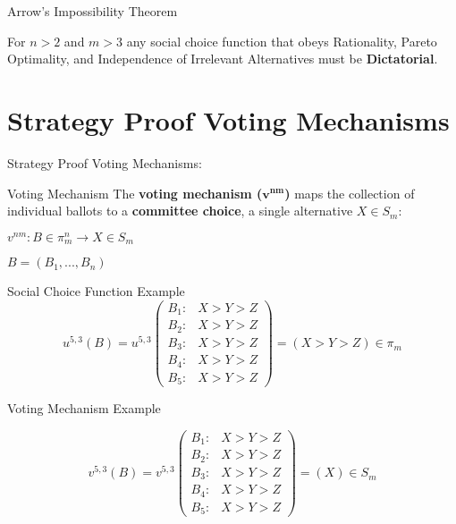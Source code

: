 \documentclass{beamer}
\begin{document}
\begin{frame}{Arrow's Impossibility Theorem}
    \begin{theorem}
    For $n > 2$ and $m > 3$ any social choice function that obeys Rationality, Pareto Optimality, and Independence of Irrelevant Alternatives must be \textbf{Dictatorial}.
    \end{theorem}
\end{frame}

\section{Strategy Proof Voting Mechanisms}

\begin{frame}
\large {Strategy Proof Voting Mechanisms:}
\end{frame}

\begin{frame}{Voting Mechanism}
    The \textbf{voting mechanism ($\mathbf{v^{nm}}$)} maps the collection of individual ballots to a \textbf{committee choice}, a single alternative $X \in S_m$:

    \vskip 0.5cm

    \center \huge $v^{nm}: B \in \pi_m^n \rightarrow X \in S_m$
    \vskip 1cm

\flushright \large $B = (B_1, ... , B_n)$
\end{frame}

\begin{frame}{Social Choice Function Example}
    \large \begin{equation*}
  u^{5,3}(B) = u^{5,3}\left(
    \begin{array}{cc}
      B_1: & \text{$X > Y > Z$}\\
      B_2: & \text{$X > Y > Z$}\\
      B_3: & \text{$X > Y > Z$}\\
      B_4: & \text{$X > Y > Z$}\\ 
      B_5: & \text{$X > Y > Z$}
    \end{array} 
    \right) = (X > Y > Z) \in \pi_m
\end{equation*}
\end{frame}

\begin{frame}{Voting Mechanism Example}

\large \begin{equation*}
  v^{5,3}(B) = v^{5,3}\left(
    \begin{array}{cc}
      B_1: & \text{$X > Y > Z$}\\
      B_2: & \text{$X > Y > Z$}\\
      B_3: & \text{$X > Y > Z$}\\
      B_4: & \text{$X > Y > Z$}\\ 
      B_5: & \text{$X > Y > Z$}
    \end{array} 
    \right) = (X) \in S_m
\end{equation*}
\end{frame}
\end{document}
